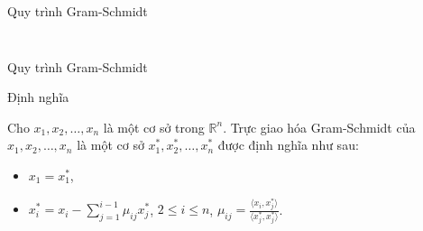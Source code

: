 \documentclass{beamer}
\numberwithin{equation}{section}
\begin{document}
\begin{frame}{Quy trình Gram-Schmidt}
\begin{columns}
\begin{column}{0.5\textwidth}
\begin{figure}[h]
{

}

\end{figure}
\end{column}

\end{columns}

\end{frame}
\begin{frame}{Quy trình Gram-Schmidt}

\begin{block}{Định nghĩa}

Cho $x_1, x_2, \ldots, x_n$ là một cơ sở trong $\mathbb{R}^n$.
Trực giao hóa Gram-Schmidt của $x_1, x_2, \ldots, x_n$
là một cơ sở $x_1^*, x_2^*, \ldots, x_n^*$ được định nghĩa như sau:

\begin{itemize}
\item $x_1 = x_1^*$,
\item $x_i^* = x_i - \sum_{j=1}^{i-1} \mu_{ij} x_j^*$, \quad $2 \leq i \leq n$, \quad $\mu_{ij} = \frac{\langle x_i, x_j^* \rangle}{\langle x_j^*, x_j^* \rangle}$.
\end{itemize}

\end{block}

\end{frame}
\end{document}
